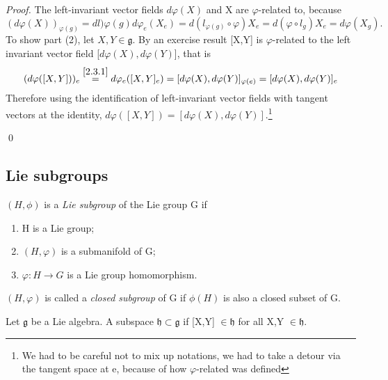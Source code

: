 \begin{proof}
 The left-invariant vector fields $d \varphi(X)$ and X are $\varphi$-related to, because 
 \begin{equation*}
  (d\varphi(X))_{\varphi(g)} = dl){\varphi(g)}d\varphi_{e}(X_e) = d(l_{\varphi(g)}\circ \varphi)X_{e} = d(\varphi \circ l_{g})X_{e} = d\varphi(X_{g}).
 \end{equation*}
 To show part (2), let $X,Y \in \mathfrak{g}$. By an exercise result [X,Y] is $\varphi$-related to the 
 left invariant vector field [$d\varphi(X), d\varphi(Y)$], that is 
 \begin{equation*}
  (d\varphi([X,Y]))_{e} \stackrel{\ref{2.3.1}}{=} d\varphi_{e}([X,Y]_e) = [d\varphi(X),d\varphi(Y)]_{\varphi(e)} = [d\varphi(X),d\varphi(Y)]_{e}
 \end{equation*}
Therefore using the identification of left-invariant vector fields with tangent vectors at the identity,
$d\varphi([X,Y])=[d\varphi(X), d\varphi(Y)].$\footnote{We had to be careful not to mix up notations, we had to take a detour via the tangent
space at e, because of how $\varphi$-related was defined}
 
\qed
\end{proof}
\subsection{Lie subgroups}
\begin{definition} $(H,\phi)$ is a \textit{Lie subgroup} of the Lie group G if 
 \begin{enumerate}
  \item H is a Lie group;
  \item $(H,\varphi)$ is a submanifold of G;
  \item $\varphi: H \rightarrow G$ is a Lie group homomorphism.
 \end{enumerate}
$(H,\varphi)$ is called a \textit{closed subgroup} of G if $\phi(H)$ is also a closed subset of G.
\end{definition}
  Let $\mathfrak{g}$ be a Lie algebra. A subspace $\mathfrak{h} \subset \mathfrak{g}$ if [X,Y] $\in \mathfrak{h}$ for all
  X,Y $\in \mathfrak{h}$.

